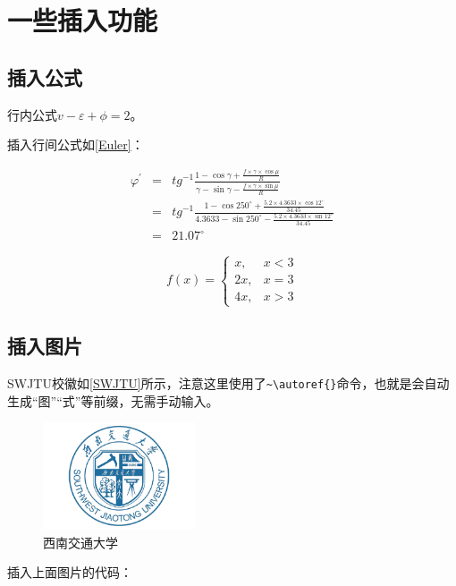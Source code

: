 \section{一些插入功能}
\subsection{插入公式}
行内公式$v-\varepsilon+\phi=2$。

插入行间公式如\autoref{Euler}：

\begin{eqnarray}
\varphi^{\prime} & = & {tg}^{-1} \frac{1-\cos \gamma+\frac{f \times \gamma \times \cos \mu}{R}}{\gamma-\sin \gamma-\frac{f \times \gamma \times \sin \mu}{R}} \label{Euler}\\& = & {tg}^{-1} \frac{1-\cos 250^{\circ}+\frac{5.2 \times 4.3633 \times \cos 12^{\circ}}{34.45}}{4.3633-\sin 250^{\circ}-\frac{5.2 \times 4.3633 \times \sin 12^{\circ}}{34.45}}\nonumber\\ & = & 21.07^{\circ}\nonumber
\end{eqnarray}

\begin{equation}
    f(x) =  {\begin{cases}  x, & x<3 \\  2x, & x=3 \\  4x, & x>3  \end{cases}}\label{方程组}
\end{equation}


\subsection{插入图片}
SWJTU校徽如\autoref{SWJTU}所示，注意这里使用了\verb|~\autoref{}|命令，也就是会自动生成“图”“式”等前缀，无需手动输入。

\begin{figure}[!htbp]
    \centering
    \includegraphics[width =0.4\textwidth]{figures/swjtu_logo2.pdf}
    \caption{西南交通大学}
    \label{SWJTU}
\end{figure}

插入上面图片的代码：

